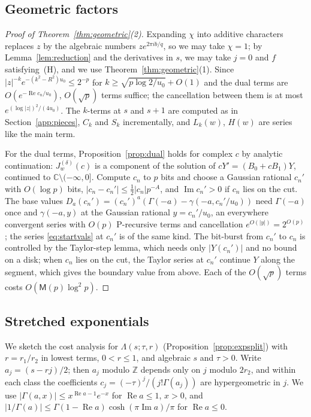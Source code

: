 \documentclass[11pt,reqno]{amsart}
\theoremstyle{definition}
\theoremstyle{remark}
\newcommand{\ZZ}{\mathbb{Z}}
\newcommand{\CC}{\mathbb{C}}
\newcommand{\Mul}{\mathsf{M}}
\begin{document}
\begin{small}
\subsection{Geometric factors}\label{app:geometric}
\begin{proof}[Proof of Theorem~\ref{thm:geometric}(2)]
Expanding $\chi$ into additive characters replaces $z$ by the algebraic numbers $ze^{2\pi ib/q}$, so we may take
$\chi = 1$; by Lemma~\ref{lem:reduction} and the derivatives in $s$, we may take $j = 0$ and $f$ satisfying~(H), and
we use Theorem~\ref{thm:geometric}(1). Since $|z|^{-k}e^{-(k^2-R^2)u_0} \le 2^{-p}$ for
$k \ge \sqrt{p\log2/u_0} + O(1)$ and the dual terms are $O(e^{-\operatorname{Re}c_n/u_0})$, $O(\sqrt p)$ terms suffice;
the cancellation between them is at most $e^{(\log|z|)^2/(4u_0)}$. The $k$-terms at $s$ and $s+1$ are computed as in
Section~\ref{app:pieces}, $C_k$ and $S_k$ incrementally, and $L_k(w)$, $H(w)$ are series like the main term.

For the dual terms, Proposition~\ref{prop:dual} holds for complex $c$ by analytic continuation: $J^{(\delta)}_w(c)$ is a
component of the solution of $cY' = (B_0 + cB_1)Y$, continued to $\CC\setminus(-\infty, 0]$. Compute $c_n$ to $p$
bits and choose a Gaussian rational $c_n'$ with $O(\log p)$ bits, $|c_n - c_n'| \le \frac12|c_n|p^{-A}$, and
$\operatorname{Im}c_n' > 0$ if $c_n$ lies on the cut. The base values $D_a(c_n') = (c_n')^a(\Gamma(-a) - \gamma(-a, c_n'/u_0))$
need $\Gamma(-a)$ once and $\gamma(-a, y)$ at the Gaussian rational $y = c_n'/u_0$, an everywhere convergent series with
$O(p)$ P-recursive terms and cancellation $e^{O(|y|)} = 2^{O(p)}$; the series \eqref{eq:startvals} at $c_n'$ is of the
same kind. The bit-burst from $c_n'$ to $c_n$ is controlled by the Taylor-step lemma, which needs only $|Y(c_n')|$
and no bound on a disk; when $c_n$ lies on the cut, the Taylor series at $c_n'$ continue $Y$ along the segment, which
gives the boundary value from above. Each of the $O(\sqrt p)$ terms costs $O(\Mul(p)\log^2p)$.
\end{proof}

\subsection{Stretched exponentials}\label{app:stretched}
We sketch the cost analysis for $\Lambda(s;\tau,r)$ (Proposition~\ref{prop:expsplit}) with $r = r_1/r_2$ in lowest
terms, $0 < r \le 1$, and algebraic $s$ and $\tau > 0$. Write $a_j = (s-rj)/2$; then $a_j$ modulo $\ZZ$ depends only
on $j$ modulo $2r_2$, and within each class the coefficients $c_j = (-\tau)^j/(j!\Gamma(a_j))$ are hypergeometric in
$j$. We use $|\Gamma(a,x)| \le x^{\operatorname{Re}a-1}e^{-x}$ for $\operatorname{Re}a \le 1$, $x > 0$, and
$|1/\Gamma(a)| \le \Gamma(1-\operatorname{Re}a)\cosh(\pi\operatorname{Im}a)/\pi$ for $\operatorname{Re}a \le 0$.


\end{small}
\end{document}
